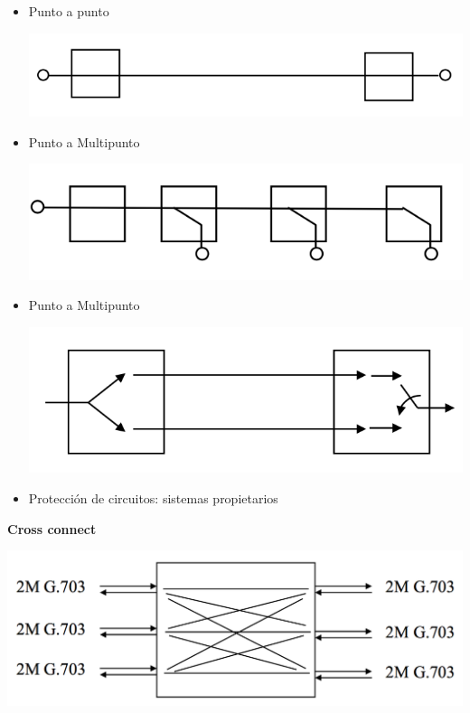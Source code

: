 \documentclass[10pt,portrait, twocolumn]{article}
\begin{document}
	\begin{itemize}
	\item Punto a punto
		\begin{center}
			\includegraphics[scale=0.2]{images/P2P}
		\end{center}
	\item Punto a Multipunto
		\begin{center}
			\includegraphics[scale=0.2]{images/P2M}
		\end{center}
	\item Punto a Multipunto
		\begin{center}
			\includegraphics[scale=0.2]{images/Uni}
		\end{center}
	\item Protección de circuitos: sistemas propietarios
	\end{itemize}

\textbf{Cross connect}

	\begin{center}
			\includegraphics[scale=0.2]{images/Cross}
		\end{center}
\end{document}

